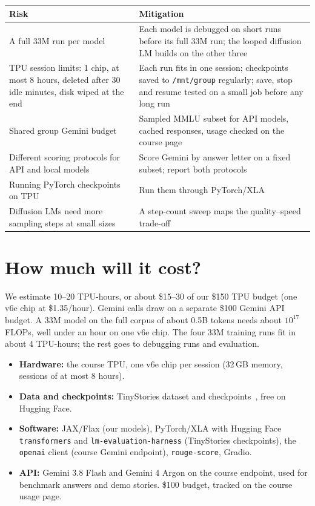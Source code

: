 \documentclass[11pt]{article}
\begin{document}
\begin{center}
\small
\begin{tabularx}{\linewidth}{Y Y}
\toprule
\textbf{Risk} & \textbf{Mitigation} \\
\midrule
A full 33M run per model & Each model is debugged on short runs before its full 33M run; the looped diffusion LM builds on the other three \\
TPU session limits: 1 chip, at most 8 hours, deleted after 30 idle minutes, disk wiped at the end & Each run fits in one session; checkpoints saved to \texttt{/mnt/group} regularly; save, stop and resume tested on a small job before any long run \\
Shared group Gemini budget & Sampled MMLU subset for API models, cached responses, usage checked on the course page \\
Different scoring protocols for API and local models & Score Gemini by answer letter on a fixed subset; report both protocols \\
Running PyTorch checkpoints on TPU & Run them through PyTorch/XLA \\
Diffusion LMs need more sampling steps at small sizes & A step-count sweep maps the quality--speed trade-off \\
\bottomrule
\end{tabularx}
\end{center}

\section{How much will it cost?}

We estimate 10--20 TPU-hours, or about \$15--30 of our \$150 TPU budget (one v6e chip at \$1.35/hour). Gemini calls draw on a separate \$100 Gemini API budget. A 33M model on the full corpus of about 0.5B tokens needs about $10^{17}$ FLOPs, well under an hour on one v6e chip. The four 33M training runs fit in about 4 TPU-hours; the rest goes to debugging runs and evaluation.

\begin{itemize}
  \item \textbf{Hardware:} the course TPU, one v6e chip per session (32\,GB memory, sessions of at most 8 hours).
  \item \textbf{Data and checkpoints:} TinyStories dataset and checkpoints~\cite{tinystorieshf}, free on Hugging Face.
  \item \textbf{Software:} JAX/Flax (our models), PyTorch/XLA with Hugging Face \texttt{transformers} and \texttt{lm-evaluation-harness} (TinyStories checkpoints), the \texttt{openai} client (course Gemini endpoint), \texttt{rouge-score}, Gradio.
  \item \textbf{API:} Gemini 3.8 Flash and Gemini 4 Argon on the course endpoint, used for benchmark answers and demo stories. \$100 budget, tracked on the course usage page.
\end{itemize}
\end{document}
